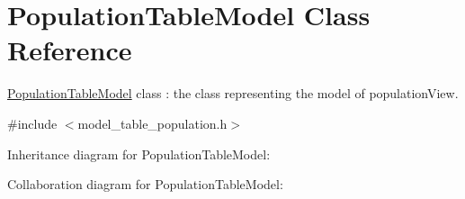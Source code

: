 \hypertarget{class_population_table_model}{}\section{Population\+Table\+Model Class Reference}
\label{class_population_table_model}


\hyperlink{class_population_table_model}{Population\+Table\+Model} class \+: the class representing the model of population\+View.  




{\ttfamily \#include $<$model\+\_\+table\+\_\+population.\+h$>$}



Inheritance diagram for Population\+Table\+Model\+:


Collaboration diagram for Population\+Table\+Model\+:
